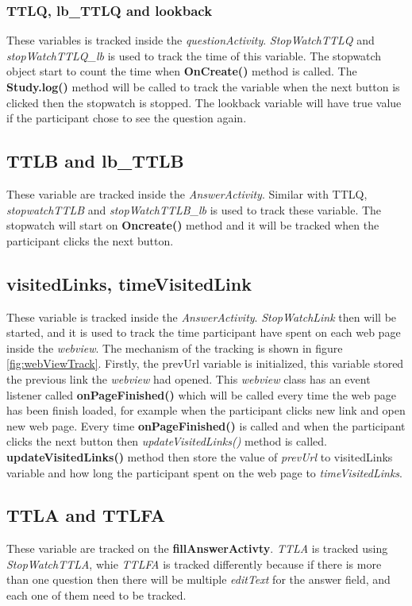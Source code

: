 \subsubsection{TTLQ, lb\_TTLQ and lookback}
These variables is tracked inside the \textit{questionActivity}.
\textit{StopWatchTTLQ} and \textit{stopWatchTTLQ\_lb} is used to track the time of this variable.
The stopwatch object start to count the time when \textbf{OnCreate()} method is called.
The \textbf{Study.log()} method will be called to track the variable when the next button is clicked then the stopwatch is stopped.
The lookback variable will have true value if the participant chose to see the question again.

\subsection{TTLB and lb\_TTLB}
These variable are tracked inside the \textit{AnswerActivity}. Similar with TTLQ,
\textit{stopwatchTTLB} and \textit{stopWatchTTLB\_lb} is used to track these variable.
The stopwatch will start on \textbf{Oncreate()} method and it will be tracked when the participant clicks the next button.

\subsection{visitedLinks, timeVisitedLink}
These variable is tracked inside the \textit{AnswerActivity}.
\textit{StopWatchLink} then will be started, and it is used to track the time participant have spent on each web page inside the \textit{webview}.
The mechanism of the tracking is shown in figure \ref{fig:webViewTrack}. Firstly, the prevUrl variable is initialized,
this variable stored the previous link the \textit{webview} had opened. This \textit{webview} class has an event listener called \textbf{onPageFinished()}
 which will be called every time the web page has been finish loaded, for example when the participant clicks new  link and open new web page.
  Every time \textbf{onPageFinished()} is called and when the participant clicks the next button then \textit{updateVisitedLinks()} method is called.
  \textbf{updateVisitedLinks()} method then store the value of \textit{prevUrl}
 to visitedLinks variable and how long the participant spent on the web page to \textit{timeVisitedLinks}.

\subsection{TTLA and TTLFA}
These variable are tracked on the \textbf{fillAnswerActivty}. \textit{TTLA} is tracked using \textit{StopWatchTTLA}, whie
\textit{TTLFA} is tracked differently because if there is more than one question then there will be multiple \textit{editText} for the answer field, and
each one of them need to be tracked.


